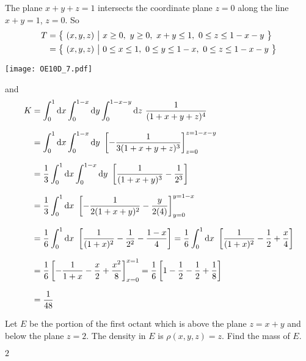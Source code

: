 \begin{solution}
The plane $x+y+z=1$ intersects the coordinate plane $z=0$
along the line $x+y=1$, $z=0$. So
\begin{align*}
T&=\big\{ \ (x,y,z)\ \big|\ x\ge 0,\  y\ge0,\ x+y\le 1,\ 0\le z\le 1-x-y\ \big\} \\
 &=\big\{ \ (x,y,z)\ \big|\ 0\le x\le 1,\  0\le y\le 1-x,\ 0\le z\le 1-x-y\ \big\}
\end{align*}
\begin{center}
     \texttt{[image: OE10D\_7.pdf]}
\end{center}
and
\begin{align*}
K&=\int_0^1\dee{x}\int_0^{1-x}\dee{y}\int_0^{1-x-y}\dee{z}\ 
           \frac{1}{ (1 + x + y + z)^4} \\[0.1in]
&=\int_0^1\dee{x}\int_0^{1-x}\dee{y}\ 
           \left[-\frac{1}{ 3(1 + x + y + z)^3}\right]_{z=0}^{z=1-x-y} \\[0.1in]
&=\frac{1}{3}\int_0^1\dee{x}\int_0^{1-x}\dee{y}\ 
           \left[\frac{1}{(1 + x + y)^3} - \frac{1}{2^3}\right] \\[0.1in]
&=\frac{1}{3}\int_0^1\dee{x}\ 
    \left[-\frac{1}{2(1 + x + y)^2} - \frac{y}{2(4)}\right]_{y=0}^{y=1-x} \\[0.1in]
&=\frac{1}{6}\int_0^1\dee{x}\ 
    \left[\frac{1}{(1 + x)^2}-\frac{1}{2^2}- \frac{1-x}{4}\right]
=\frac{1}{6}\int_0^1\dee{x}\ 
    \left[\frac{1}{(1 + x)^2} -\frac{1}{2} + \frac{x}{4}\right] \\[0.1in]
&=\frac{1}{6} 
    \left[-\frac{1}{1 + x} -\frac{x}{2} + \frac{x^2}{8}\right]_{x=0}^{x=1}
=\frac{1}{6} 
    \left[1-\frac{1}{2} -\frac{1}{2} + \frac{1}{8}\right] \\[0.1in]
&=\frac{1}{48}
\end{align*}
\end{solution}

\begin{question}[M200 2011A] %
Let $E$ be the portion of the first octant which is above the plane $z = x + y$ 
and below the plane $z = 2$. The density in $E$ is $\rho(x, y, z) = z$. Find the mass of $E$.
\end{question}

%

\begin{answer}
$2$
\end{answer}

